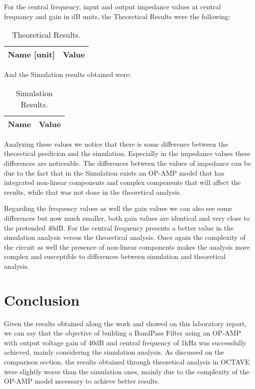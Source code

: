 For the central frequency, input and output impedance values at central frequancy and gain in dB units, the Theoretical Results were the following:

\begin{table}[H]
	\centering
	\begin{tabular}{|l|r|}
		\hline    
		{\bf Name [unit]} & {\bf Value} \\ \hline
		
	\end{tabular}
	\caption{Theoretical Results.}
	\label{tab:teo}
\end{table}

And the Simulation results obtained were:

\begin{table}[H]
	\centering
	\begin{tabular}{|l|r|}
		\hline    
		{\bf Name} & {\bf Value} \\ \hline
		
	\end{tabular}
	\caption{Simulation Results.}
	\label{tab:sim}
\end{table}

Analyzing these values we notice that there is some difference between the theoretical predicion and the simulation. Especially in the impedance values these differences are noticeable.
The differences between the values of impedance can be due to the fact that in the Simulation exists an OP-AMP model that has integrated non-linear components and complex components that will affect the results, while that was not done in the theoretical analysis.

Regarding the frequency values as well the gain values we can also see some differences but now much smaller, both gain values are identical and very close to the pretended 40dB. For the central frequency presents a better value in the simulation analysis versus the theoretical analysis. Once again the complexity of the circuit as well the presence of non-linear components makes the analysis more complex and susceptible to differences between simulation and theoretical analysis.\par 






\newpage
\section{Conclusion}
\label{sec:conclusion}

Given the results obtained along the work and showed on this laboratory report, we can say that the objective of building a BandPass Filter using an OP-AMP with output voltage gain of 40dB and central frequency of 1kHz was successfully achieved, mainly considering the simulation analysis. As discussed on the comparison section, the results obtained through theoretical analysis in OCTAVE were slightly worse than the simulation ones, mainly due to the complexity of the OP-AMP model necessary to achieve better results.





